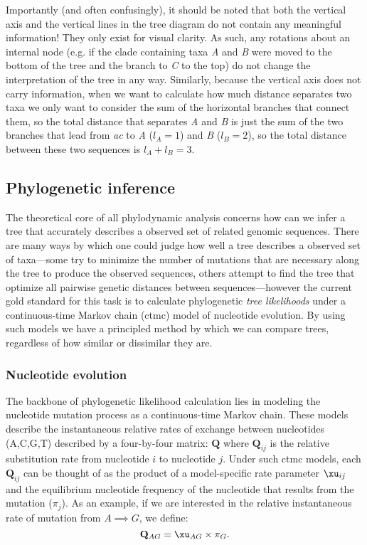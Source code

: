 Importantly (and often confusingly), it should be noted that both the vertical axis and the vertical lines in the tree diagram do not contain any meaningful information!
They only exist for visual clarity.
As such, any rotations about an internal node (e.g. if the clade containing taxa \textit{A} and \textit{B} were moved to the bottom of the tree and the branch to \textit{C} to the top) do not change the interpretation of the tree in any way.
Similarly, because the vertical axis does not carry information, when we want to calculate how much distance separates two taxa we only want to consider the sum of the horizontal branches that connect them, so the total distance that separates \textit{A} and \textit{B} is just the sum of the two branches that lead from \textit{ac} to \textit{A} ($l_A=1$) and \textit{B} ($l_B=2$), so the total distance between these two sequences is $l_A + l_B = 3$.

\subsection{Phylogenetic inference}
The theoretical core of all phylodynamic analysis concerns how can we infer a tree that accurately describes a observed set of related genomic sequences.
There are many ways by which one could judge how well a tree describes a observed set of taxa---some try to minimize the number of mutations that are necessary along the tree to produce the observed sequences, others attempt to find the tree that optimize all pairwise genetic distances between sequences---however the current gold standard for this task is to calculate phylogenetic \textit{tree likelihoods} under a continuous-time Markov chain (\gls{ctmc}) model of nucleotide evolution.
By using such models we have a principled method by which we can compare trees, regardless of how similar or dissimilar they are.

\subsubsection{Nucleotide evolution}
The backbone of phylogenetic likelihood calculation lies in modeling the nucleotide mutation process as a continuous-time Markov chain.
These models describe the instantaneous relative rates of exchange between nucleotides (A,C,G,T) described by a four-by-four matrix: $\mathbf{Q}$ where $\mathbf{Q}_{ij}$ is the relative substitution rate from nucleotide $i$ to nucleotide $j$.
Under such \gls{ctmc} models, each $\mathbf{Q}_{ij}$ can be thought of as the product of a model-specific rate parameter $\xu_{ij}$ and the equilibrium nucleotide frequency of the nucleotide that results from the mutation ($\pi_j$).
As an example, if we are interested in the relative instantaneous rate of mutation from $A \implies G$, we define:
\begin{equation}
  \mathbf{Q}_{AG} = \xu_{AG} \times \pi_G.
\end{equation}

